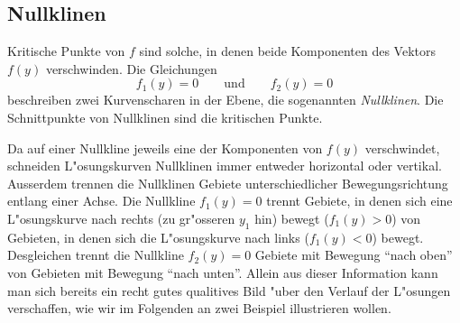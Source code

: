 \subsection{Nullklinen}
Kritische Punkte von $f$ sind solche, in denen beide Komponenten
des Vektors $f(y)$ verschwinden.
Die Gleichungen
\[
f_1(y)=0
\qquad\text{und}\qquad
f_2(y)=0
\]
beschreiben zwei Kurvenscharen in der Ebene, die sogenannten 
{\em Nullklinen}.
Die Schnittpunkte von Nullklinen sind die kritischen Punkte.

Da auf einer Nullkline jeweils eine der Komponenten von $f(y)$ verschwindet,
schneiden L"osungskurven Nullklinen immer entweder horizontal oder
vertikal.
Ausserdem trennen die Nullklinen Gebiete unterschiedlicher Bewegungsrichtung
entlang einer Achse. 
Die Nullkline $f_1(y)=0$ trennt Gebiete, in denen sich eine L"osungskurve
nach rechts (zu gr"osseren $y_1$ hin) bewegt ($f_1(y)>0$) von Gebieten,
in denen sich die L"osungskurve nach links ($f_1(y)<0$) bewegt.
Desgleichen trennt die Nullkline $f_2(y)=0$ Gebiete mit Bewegung ``nach oben''
von Gebieten mit Bewegung ``nach unten''.
Allein aus dieser Information kann man sich bereits ein recht gutes
qualitives Bild "uber den Verlauf der L"osungen verschaffen, wie wir
im Folgenden an zwei Beispiel illustrieren wollen.

